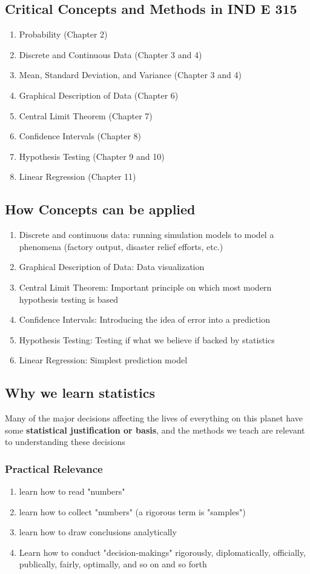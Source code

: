 \documentclass[../INDE315.tex]{subfiles}
\begin{document}
\subsection*{Critical Concepts and Methods in IND E 315}
\begin{enumerate}
    \item Probability (Chapter 2)
    \item Discrete and Continuous Data (Chapter 3 and 4)
    \item Mean, Standard Deviation, and Variance (Chapter 3 and 4)
    \item Graphical Description of Data (Chapter 6)
    \item Central Limit Theorem (Chapter 7)
    \item Confidence Intervals (Chapter 8)
    \item Hypothesis Testing (Chapter 9 and 10)
    \item Linear Regression (Chapter 11)
\end{enumerate}

\subsection*{How Concepts can be applied}
\begin{enumerate}
    \item Discrete and continuous data: running simulation models to model a phenomena (factory output, disaster relief efforts, etc.)
    \item Graphical Description of Data: Data visualization
    \item Central Limit Theorem: Important principle on which most modern hypothesis testing is based
    \item Confidence Intervals: Introducing the idea of error into a prediction
    \item Hypothesis Testing: Testing if what we believe if backed by statistics
    \item Linear Regression: Simplest prediction model
\end{enumerate}

\subsection*{Why we learn statistics}
Many of the major decisions affecting the lives of everything on this planet have some \textbf{statistical justification or basis}, and the methods we teach are relevant to understanding these decisions
\subsubsection*{Practical Relevance}
\begin{enumerate}
    \item learn how to read "numbers"
    \item learn how to collect "numbers" (a rigorous term is "samples")
    \item learn how to draw conclusions analytically
    \item Learn how to conduct "decision-makings" rigorously, diplomatically, officially, publically, fairly, optimally, and so on and so forth 
\end{enumerate}
\end{document}
